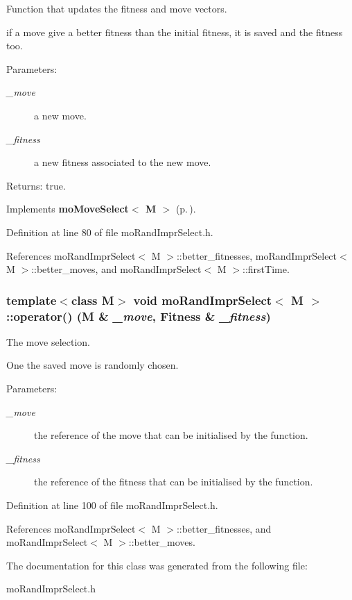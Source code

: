 Function that updates the fitness and move vectors. 

if a move give a better fitness than the initial fitness, it is saved and the fitness too.

\begin{Desc}
\item[Parameters:]
\begin{description}
\item[{\em \_\-move}]a new move. \item[{\em \_\-fitness}]a new fitness associated to the new move. \end{description}
\end{Desc}
\begin{Desc}
\item[Returns:]true. \end{Desc}


Implements {\bf mo\-Move\-Select$<$ M $>$} {\rm (p.\,\pageref{classmo_move_select_a1})}.

Definition at line 80 of file mo\-Rand\-Impr\-Select.h.

References mo\-Rand\-Impr\-Select$<$ M $>$::better\_\-fitnesses, mo\-Rand\-Impr\-Select$<$ M $>$::better\_\-moves, and mo\-Rand\-Impr\-Select$<$ M $>$::first\-Time.
\subsubsection{\setlength{\rightskip}{0pt plus 5cm}template$<$class M$>$ void {\bf mo\-Rand\-Impr\-Select}$<$ M $>$::operator() (M \& {\em \_\-move}, {\bf Fitness} \& {\em \_\-fitness})\hspace{0.3cm}{\tt  [inline]}}\label{classmo_rand_impr_select_a2}


The move selection. 

One the saved move is randomly chosen.

\begin{Desc}
\item[Parameters:]
\begin{description}
\item[{\em \_\-move}]the reference of the move that can be initialised by the function. \item[{\em \_\-fitness}]the reference of the fitness that can be initialised by the function. \end{description}
\end{Desc}


Definition at line 100 of file mo\-Rand\-Impr\-Select.h.

References mo\-Rand\-Impr\-Select$<$ M $>$::better\_\-fitnesses, and mo\-Rand\-Impr\-Select$<$ M $>$::better\_\-moves.

The documentation for this class was generated from the following file:\begin{CompactItemize}
\item 
mo\-Rand\-Impr\-Select.h\end{CompactItemize}
